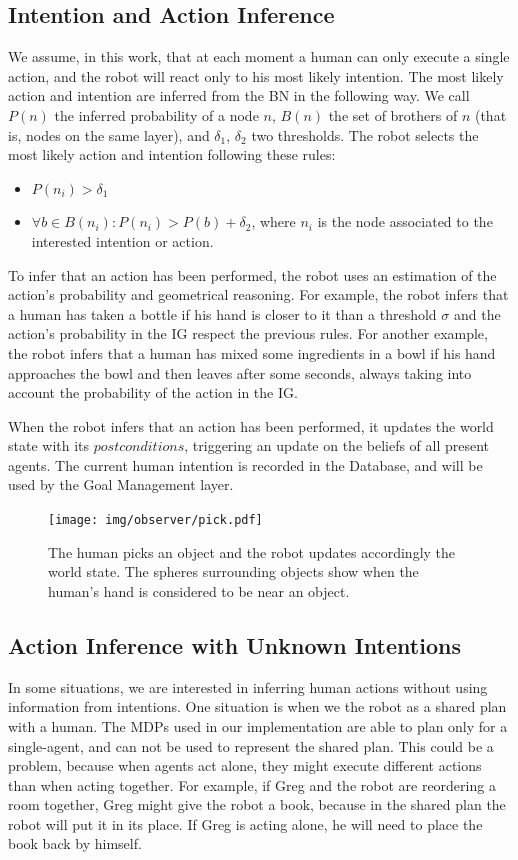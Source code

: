 \subsection{Intention and Action Inference}
\label{sec:intention-intention and action inference}
We assume, in this work, that at each moment a human can only execute a single action, and the robot will react only to his most likely intention. The most likely action and intention are inferred from the BN in the following way. We call $P(n)$ the inferred probability of a node $n$, $B(n)$ the set of brothers of $n$ (that is, nodes on the same layer), and $\delta_1$, $\delta_2$ two thresholds. The robot selects the most likely action and intention following these rules: 
\begin{itemize}
\item  \(P(n_i)>\delta_1\) 
\item  \(\forall b \in B(n_i): P(n_i)>P(b)+\delta_2\), where $n_i$ is the node associated to the interested intention or action.
\end{itemize}

To infer that an action has been performed, the robot uses an estimation of the action's probability and geometrical reasoning. For example, the robot infers that a human has taken a bottle if his hand is closer to it than a threshold $\sigma$  and the action's probability in the IG respect the previous rules. For another example, the robot infers that a human has mixed some ingredients in a bowl if his hand approaches the bowl and then leaves after some seconds, always taking into account the probability of the action in the IG.

When the robot infers that an action has been performed, it updates the world state with its $postconditions$, triggering an update on the beliefs of all present agents. The current human intention is recorded in the Database, and will be used by the Goal Management layer.

 \begin{figure}[ht!]
	\centering
	\texttt{[image: img/observer/pick.pdf]}
	\caption[Actions and world update]{The human picks an object and the robot updates accordingly the world state. The spheres surrounding objects show when the human's hand is considered to be near an object.}
	\label{fig:intention-pick}
\end{figure}

\subsection{Action Inference with Unknown Intentions}
In some situations, we are interested in inferring human actions without using information from intentions. One situation is when we the robot as a shared plan with a human. The MDPs used in our implementation are able to plan only for a single-agent, and can not be used to represent the shared plan. This could be a problem, because when agents act alone, they might execute different actions than when acting together. For example, if Greg and the robot are reordering a room together, Greg might give the robot a book, because in the shared plan the robot will put it in its place. If Greg is acting alone, he will need to place the book back by himself.  

